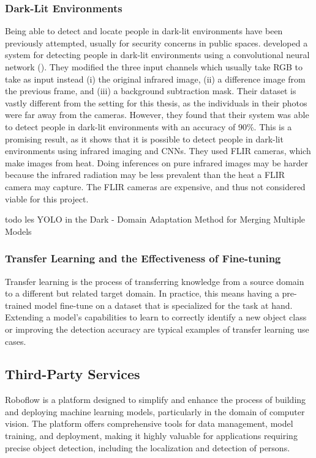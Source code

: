 \subsubsection{Dark-Lit Environments}
Being able to detect and locate people in dark-lit environments have been previously attempted, usually for security concerns in public spaces. \citeauthor{pa2020PersonDetectionNightTimeFLIR} developed a system for detecting people in dark-lit environments using a convolutional neural network (\citeyear{pa2020PersonDetectionNightTimeFLIR}). They modified the three input channels which usually take RGB to take as input instead (i) the original infrared image, (ii) a difference image from the previous frame, and (iii) a background subtraction mask. Their dataset is vastly different from the setting for this thesis, as the individuals in their photos were far away from the cameras. However, they found that their system was able to detect people in dark-lit environments with an accuracy of 90\%. This is a promising result, as it shows that it is possible to detect people in dark-lit environments using infrared imaging and CNNs. They used FLIR cameras, which make images from heat. Doing inferences on pure infrared images may be harder because the infrared radiation may be less prevalent than the heat a FLIR camera may capture. The FLIR cameras are expensive, and thus not considered viable for this project.


todo les YOLO in the Dark - Domain Adaptation Method for Merging Multiple Models

\subsubsection{Transfer Learning and the Effectiveness of Fine-tuning}
\label{sec:dataset_specialization}
Transfer learning is the process of transferring knowledge from a source domain to a different but related target domain. In practice, this means having a pre-trained model fine-tune on a dataset that is specialized for the task at hand. Extending a model's capabilities to learn to correctly identify a new object class or improving the detection accuracy are typical examples of transfer learning use cases. 

\subsection{Third-Party Services}
\label{sec:thirdparty}
Roboflow is a platform designed to simplify and enhance the process of building and deploying machine learning models, particularly in the domain of computer vision. The platform offers comprehensive tools for data management, model training, and deployment, making it highly valuable for applications requiring precise object detection, including the localization and detection of persons.

